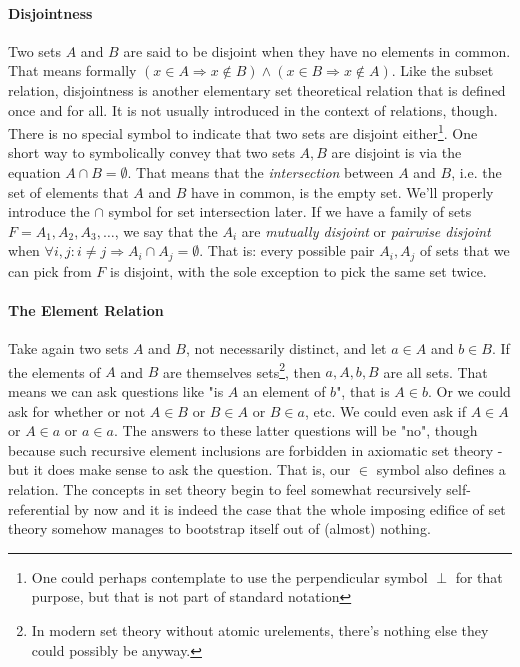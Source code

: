 \paragraph{Disjointness}
Two sets $A$ and $B$ are said to be disjoint when they have no elements in common. That means formally $(x \in A \Rightarrow x \notin B) \wedge (x \in B \Rightarrow x \notin A)$. Like the subset relation, disjointness is another elementary set theoretical relation that is defined once and for all. It is not usually introduced in the context of relations, though. There is no special symbol to indicate that two sets are disjoint either\footnote{One could perhaps contemplate to use the perpendicular symbol $\perp$ for that purpose, but that is not part of standard notation}. One short way to symbolically convey that two sets $A,B$ are disjoint is via the equation $A \cap B = \emptyset$. That means that the \emph{intersection} between $A$ and $B$, i.e. the set of elements that $A$ and $B$ have in common, is the empty set. We'll properly introduce the $\cap$ symbol for set intersection later. If we have a family of sets $F = A_1, A_2, A_3, \ldots$, we say that the $A_i$ are \emph{mutually disjoint} or \emph{pairwise disjoint} when $\forall i,j: i \neq j \Rightarrow A_i \cap A_j = \emptyset$. That is: every possible pair $A_i, A_j$ of sets that we can pick from $F$ is disjoint, with the sole exception to pick the same set twice.



\paragraph{The Element Relation} 
Take again two sets $A$ and $B$, not necessarily distinct, and let $a \in A$ and $b \in B$. If the elements of $A$ and $B$ are themselves sets\footnote{In modern set theory without atomic urelements, there's nothing else they could possibly be anyway.}, then $a,A,b,B$ are all sets. That means we can ask questions like "is $A$ an element of $b$", that is $A \in b$. Or we could ask for whether or not $A \in B$ or $B \in A$ or $B \in a$, etc. We could even ask if $A \in A$ or $A \in a$ or $a \in a$. The answers to these latter questions will be "no", though because such recursive element inclusions are forbidden in axiomatic set theory - but it does make sense to ask the question. That is, our $\in$ symbol also defines a relation. The concepts in set theory begin to feel somewhat recursively self-referential by now and it is indeed the case that the whole imposing edifice of set theory somehow manages to bootstrap itself out of (almost) nothing.





